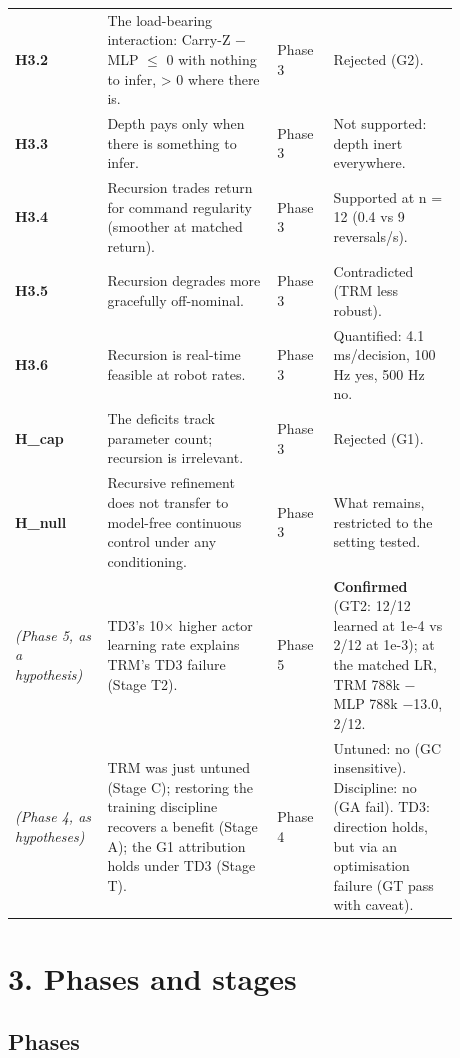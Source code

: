 \documentclass[11pt]{article}
\begin{document}
\begin{center}
\begin{tabular}{>{\raggedright\arraybackslash}p{0.161\linewidth}>{\raggedright\arraybackslash}p{0.344\linewidth}>{\raggedright\arraybackslash}p{0.115\linewidth}>{\raggedright\arraybackslash}p{0.258\linewidth}}
\textbf{H3.2} & The load-bearing interaction: Carry-Z $-$ MLP $\leq$ 0 with nothing to infer, > 0 where there is. & Phase 3 & Rejected (G2). \\
\textbf{H3.3} & Depth pays only when there is something to infer. & Phase 3 & Not supported: depth inert everywhere. \\
\textbf{H3.4} & Recursion trades return for command regularity (smoother at matched return). & Phase 3 & Supported at n = 12 (0.4 vs 9 reversals/s). \\
\textbf{H3.5} & Recursion degrades more gracefully off-nominal. & Phase 3 & Contradicted (TRM less robust). \\
\textbf{H3.6} & Recursion is real-time feasible at robot rates. & Phase 3 & Quantified: 4.1 ms/decision, 100 Hz yes, 500 Hz no. \\
\textbf{H\_cap} & The deficits track parameter count; recursion is irrelevant. & Phase 3 & Rejected (G1). \\
\textbf{H\_null} & Recursive refinement does not transfer to model-free continuous control under any conditioning. & Phase 3 & What remains, restricted to the setting tested. \\
\emph{(Phase 5, as a hypothesis)} & TD3's 10$\times$ higher actor learning rate explains TRM's TD3 failure (Stage T2). & Phase 5 & \textbf{Confirmed} (GT2: 12/12 learned at 1e-4 vs 2/12 at 1e-3); at the matched LR, TRM 788k $-$ MLP 788k $-$13.0, 2/12. \\
\emph{(Phase 4, as hypotheses)} & TRM was just untuned (Stage C); restoring the training discipline recovers a benefit (Stage A); the G1 attribution holds under TD3 (Stage T). & Phase 4 & Untuned: no (GC insensitive). Discipline: no (GA fail). TD3: direction holds, but via an optimisation failure (GT pass with caveat). \\
\bottomrule
\end{tabular}\end{center}



\section*{3. Phases and stages}



\subsection*{Phases}
\end{document}
